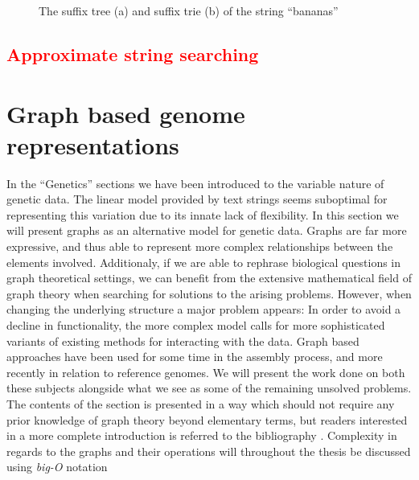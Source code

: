 \documentclass[thesis.tex]{subfiles}
\begin{document}
\begin{figure}[!b]
\begin{minipage}[t]{0.49\textwidth}
\begin{subfigure}[t]{\textwidth}
\begin{mdframed}
\begin{center}
        \end{center}
      \end{mdframed}
      \caption{}
      \label{fig:suffix_tree}
    \end{subfigure}
    \begin{minipage}[t]{0.49\textwidth}
      \caption[Examples of suffix trees]{The suffix tree (a) and suffix trie  (b) of the string ``bananas''}
    \end{minipage}
  \end{minipage}
  \label{fig:suffix_trees}
\end{figure}
\subsection{\textcolor{red}{Approximate string searching}}
\clearpage
\section{Graph based genome representations}
In the ``Genetics'' sections we have been introduced to the variable nature of genetic data. The linear model provided by text strings seems suboptimal for representing this variation due to its innate lack of flexibility. In this section we will present graphs as an alternative model for genetic data. Graphs are far more expressive, and thus able to represent more complex relationships between the elements involved. Additionaly, if we are able to rephrase biological questions in graph theoretical settings, we can benefit from the extensive mathematical field of graph theory when searching for solutions to the arising problems. However, when changing the underlying structure a major problem appears: In order to avoid a decline in functionality, the more complex model calls for more sophisticated variants of existing methods for interacting with the data. Graph based approaches have been used for some time in the assembly process, and more recently in relation to reference genomes. We will present the work done on both these subjects alongside what we see as some of the remaining unsolved problems. The contents of the section is presented in a way which should not require any prior knowledge of graph theory beyond elementary terms, but readers interested in a more complete introduction is referred to the bibliography \cite[Chapter 9]{data_structures_and_algorithm_analysis_in_java}\cite[Chapter 11]{algorithms_sequential_parallell_and_distributed} \cite[Chapter 0]{introduction_to_the_theory_of_computation}. Complexity in regards to the graphs and their operations will throughout the thesis be discussed using \textit{big-O} notation \cite[Chapter 2]{data_structures_and_algorithm_analysis_in_java}\cite[Section 3.1]{algorithms_sequential_parallell_and_distributed}
\end{document}
